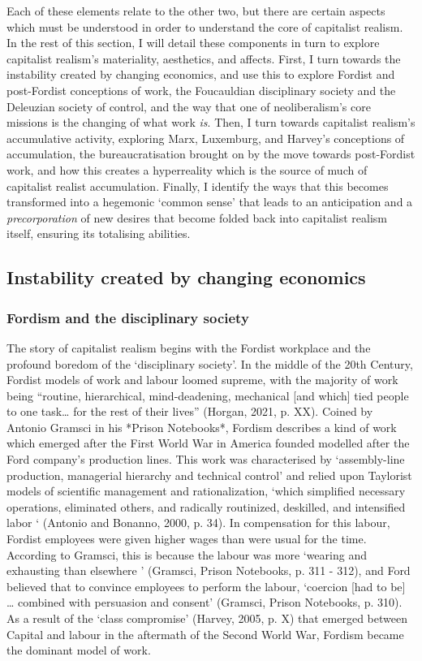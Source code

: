 Each of these elements relate to the other two, but there are certain
aspects which must be understood in order to understand the core of
capitalist realism. In the rest of this section, I will detail these
components in turn to explore capitalist realism's materiality,
aesthetics, and affects. First, I turn towards the instability created
by changing economics, and use this to explore Fordist and post-Fordist
conceptions of work, the Foucauldian disciplinary society and the
Deleuzian society of control, and the way that one of neoliberalism's
core missions is the changing of what work \emph{is}. Then, I turn
towards capitalist realism's accumulative activity, exploring Marx,
Luxemburg, and Harvey's conceptions of accumulation, the
bureaucratisation brought on by the move towards post-Fordist work, and
how this creates a hyperreality which is the source of much of
capitalist realist accumulation. Finally, I identify the ways that this
becomes transformed into a hegemonic `common sense' that leads to an
anticipation and a \emph{precorporation} of new desires that become
folded back into capitalist realism itself, ensuring its totalising
abilities.

\subsection{Instability created by changing
economics}
\label{2-instability}

\subsubsection{Fordism and the disciplinary
society}
\label{fordism-and-the-disciplinary-society}

The story of capitalist realism begins with the Fordist workplace and
the profound boredom of the `disciplinary society'. In the middle of the
20th Century, Fordist models of work and labour loomed supreme, with the
majority of work being ``routine, hierarchical, mind-deadening,
mechanical {[}and which{]} tied people to one task\ldots{} for the rest
of their lives'' (Horgan, 2021, p. XX). Coined by Antonio Gramsci in his
*Prison Notebooks*, Fordism describes a kind of work which emerged after
the First World War in America founded modelled after the Ford company's
production lines. This work was characterised by `assembly-line
production, managerial hierarchy and technical control' and relied upon
Taylorist models of scientific management and rationalization, `which
simplified necessary operations, eliminated others, and radically
routinized, deskilled, and intensified labor ` (Antonio and Bonanno,
2000, p. 34). In compensation for this labour, Fordist employees were
given higher wages than were usual for the time. According to Gramsci,
this is because the labour was more `wearing and exhausting than
elsewhere ' (Gramsci, Prison Notebooks, p. 311 - 312), and Ford believed
that to convince employees to perform the labour, `coercion {[}had to
be{]} \ldots{} combined with persuasion and consent' (Gramsci, Prison
Notebooks, p. 310). As a result of the `class compromise' (Harvey, 2005,
p. X) that emerged between Capital and labour in the aftermath of the
Second World War, Fordism became the dominant model of work.

